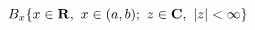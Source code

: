 \begin{equation}
B_x \{ x \in {\bf R},\ x \in (a,b);\
       z \in {\bf C},\ |z| < \infty  \}
\label{1.16}
\end{equation}

